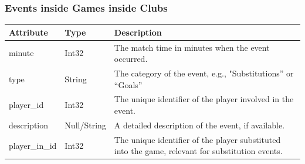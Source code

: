 \documentclass{Configuration_Files/PoliMi3i_thesis}
\begin{document}
\subsubsection{Events inside Games inside Clubs}
    \begin{tabular}{|l|l|p{8cm}|}
    \hline
    \textbf{Attribute}    & \textbf{Type}          & \textbf{Description}                                                                 \\ \hline
    minute                & Int32                  & The match time in minutes when the event occurred.                                   \\ \hline
    type                  & String                 & The category of the event, e.g., "Substitutions” or “Goals”                         \\ \hline
    player\_id            & Int32                  & The unique identifier of the player involved in the event.                          \\ \hline
    description           & Null/String            & A detailed description of the event, if available.                                  \\ \hline
    player\_in\_id        & Int32                  & The unique identifier of the player substituted into the game, relevant for substitution events. \\ \hline
    \end{tabular}
    


    \newpage
\end{document}
